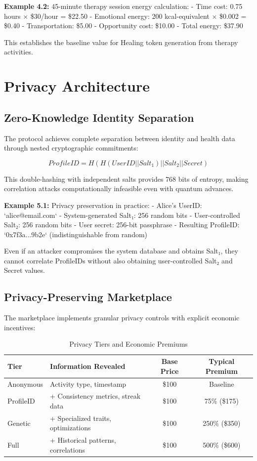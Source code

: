 \documentclass[11pt,letterpaper]{article}
\begin{document}
\textbf{Example 4.2:} 45-minute therapy session energy calculation:
- Time cost: 0.75 hours × \$30/hour = \$22.50
- Emotional energy: 200 kcal-equivalent × \$0.002 = \$0.40
- Transportation: \$5.00
- Opportunity cost: \$10.00
- Total energy: \$37.90

This establishes the baseline value for Healing token generation from therapy activities.

\section{Privacy Architecture}

\subsection{Zero-Knowledge Identity Separation}

The protocol achieves complete separation between identity and health data through nested cryptographic commitments:

\begin{equation}
ProfileID = H(H(UserID || Salt_1) || Salt_2 || Secret)
\end{equation}

This double-hashing with independent salts provides 768 bits of entropy, making correlation attacks computationally infeasible even with quantum advances.

\textbf{Example 5.1:} Privacy preservation in practice:
- Alice's UserID: `alice@email.com` 
- System-generated Salt₁: 256 random bits
- User-controlled Salt₂: 256 random bits
- User secret: 256-bit passphrase
- Resulting ProfileID: `0x7f3a...9b2e` (indistinguishable from random)

Even if an attacker compromises the system database and obtains Salt₁, they cannot correlate ProfileIDs without also obtaining user-controlled Salt₂ and Secret values.

\subsection{Privacy-Preserving Marketplace}

The marketplace implements granular privacy controls with explicit economic incentives:

\begin{table}[h]
\centering
\caption{Privacy Tiers and Economic Premiums}
\begin{tabular}{llcc}
\toprule
\textbf{Tier} & \textbf{Information Revealed} & \textbf{Base Price} & \textbf{Typical Premium} \\
\midrule
Anonymous & Activity type, timestamp & \$100 & Baseline \\
ProfileID & + Consistency metrics, streak data & \$100 & 75\% (\$175) \\
Genetic & + Specialized traits, optimizations & \$100 & 250\% (\$350) \\
Full & + Historical patterns, correlations & \$100 & 500\% (\$600) \\
\bottomrule
\end{tabular}
\end{table}
\end{document}
